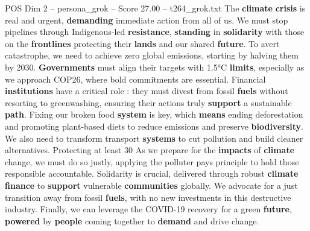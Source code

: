 \begin{textsample}{POS Dim 2 – persona\_grok – Score 27.00 – t264\_grok.txt}  \label{ex:f2_pos_034}
The \textbf{climate} \textbf{crisis} is real and urgent, \textbf{demanding} immediate action from all of us.
We must stop pipelines through Indigenous-led \textbf{resistance}, \textbf{standing} in \textbf{solidarity} with those on the \textbf{frontlines} protecting their \textbf{lands} and our shared \textbf{future}.
To avert catastrophe, we need to achieve zero global emissions, starting by halving them by 2030. \textbf{Governments} must align their targets with 1.5°C \textbf{limits}, especially as we approach COP26, where bold commitments are essential.
Financial \textbf{institutions} have a critical role : they must divest from fossil \textbf{fuels} without resorting to greenwashing, ensuring their actions truly \textbf{support} a sustainable \textbf{path}.
Fixing our broken food \textbf{system} is key, which \textbf{means} ending deforestation and promoting plant-based diets to reduce emissions and preserve \textbf{biodiversity}.
We also need to transform transport \textbf{systems} to cut pollution and build cleaner alternatives.
Protecting at least 30 %
As we prepare for the \textbf{impacts} of \textbf{climate} change, we must do so justly, applying the polluter pays principle to hold those responsible accountable.
Solidarity is crucial, delivered through robust \textbf{climate} \textbf{finance} to \textbf{support} vulnerable \textbf{communities} globally.
We advocate for a just transition away from fossil \textbf{fuels}, with no new investments in this destructive industry.
Finally, we can leverage the COVID-19 recovery for a green \textbf{future}, \textbf{powered} by \textbf{people} coming together to \textbf{demand} and drive change.

\end{textsample}
